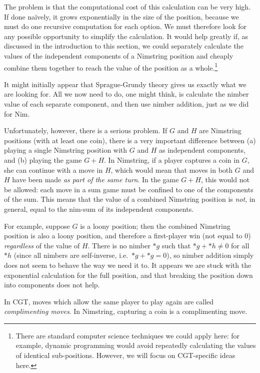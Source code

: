 \documentclass[a4paper,twocolumn]{article}
\begin{document}
The problem is that the computational cost of this calculation can be very
high. If done na\"ively, it grows exponentially in the size of the
position, because we must do one recursive computation for each option.
We must therefore look for any possible opportunity to simplify the
calculation. It would help greatly if, as discussed in the introduction
to this section, we could separately calculate the values of the independent
components of a Nimstring position and cheaply combine them together
to reach the value of the position as a whole.\footnote{There are
standard computer science techniques we could apply here: for example,
dynamic programming would avoid repeatedly calculating the values of
identical sub-positions. However, we will focus on CGT-specific ideas here.}

It might initially appear that Sprague-Grundy theory gives us exactly
what we are looking for. All we now need to do, one might think, is
calculate the nimber value of each separate component, and then use
nimber addition, just as we did for Nim.

Unfortunately, however, there is a serious problem. If $G$ and $H$ are
Nimstring positions (with at least one coin), there is a very
important difference between (a) playing a single Nimstring position
with $G$ and $H$ as independent components, and (b) playing the game
$G+H$. In Nimstring, if a player captures a coin in $G$, she can
continue with a move in $H$, which would mean that moves in both $G$
and $H$ have been made \emph{as part of the same turn}. In the game
$G+H$, this would not be allowed: each move in a sum game must be
confined to one of the components of the sum. This means that the
value of a combined Nimstring position is \emph{not}, in general,
equal to the nim-sum of its independent components.

For example, suppose $G$ is a loony position; then the combined
Nimstring position is also a loony position, and therefore a
first-player win (not equal to $0$) \emph{regardless} of the value of
$H$. There is no nimber $*g$ such that $*g + *h \neq 0$ for all $*h$
(since all nimbers are self-inverse, i.e.\ $*g + *g = 0$), so nimber
addition simply does not seem to behave the way we need it to. It
appears we are stuck with the exponential calculation for the full
position, and that breaking the position down into components does not
help.

In CGT, moves which allow the same player to play again are called
\emph{complimenting moves}. In Nimstring, capturing a coin is a
complimenting move.
\end{document}
